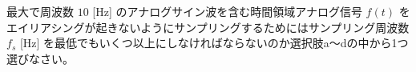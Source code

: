 最大で周波数 $10$ [Hz] のアナログサイン波を含む時間領域アナログ信号 $f(t)$ をエイリアシングが起きないようにサンプリングするためにはサンプリング周波数 $f_s$ [Hz] を最低でもいくつ以上にしなければならないのか選択肢a〜dの中から1つ選びなさい。
